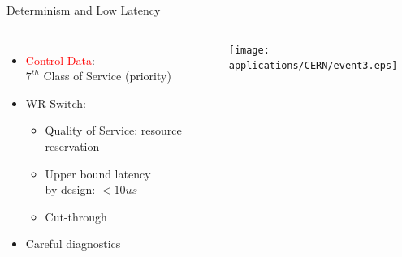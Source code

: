 \documentclass[compress,red]{beamer}
\begin{document}
\begin{frame}{Determinism and Low Latency}

\begin{columns}[c]

      \begin{itemize}
	    \item \textcolor{red}{Control Data}: \\$7^{th}$ Class of Service (priority)
	    \item WR Switch:
	    \begin{itemize}
	      \item Quality of Service: resource reservation
	      \item Upper bound latency \\ by design: $<10us$
	      \item Cut-through
	    \end{itemize}
	    \item Careful diagnostics
      \end{itemize}
% 
    \begin{center}
    \texttt{[image: applications/CERN/event3.eps]}
    \end{center}

\end{columns}

\end{frame}
% 
% 
\end{document}
